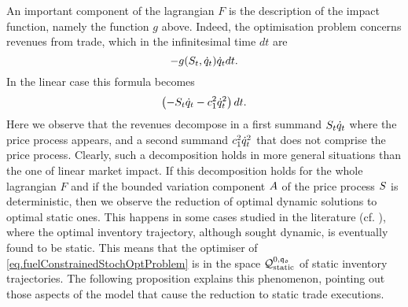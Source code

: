 \documentclass[10pt,a4paper]{article}
\begin{document}
An important component of the lagrangian $F$ is the description of the impact function, namely the function $g$ above. Indeed, the optimisation problem concerns revenues from trade, which in the infinitesimal time $dt$ are 
\begin{equation*}
-g(S_t, \dot{q}_t) \dot{q}_t dt.
\end{equation*}
In the linear case this formula becomes
\begin{equation*}
\left(-S_t \dot{q}_t - c_{1}^{2} \dot{q}_t^{2} \right) dt.
\end{equation*}
Here we observe that the revenues decompose in a first summand $S_t \dot{q}_t$ where the price process appears, and a second summand $c_{1}^{2} \dot{q}_t^{2}$ that does not comprise the price process. Clearly, such a decomposition holds in more general situations than the one of linear market impact. If this decomposition holds for the whole lagrangian $F$ and if the bounded variation component $A$ of the price process $S$ is deterministic, then we observe the reduction of optimal dynamic solutions to optimal static ones.   This happens in some cases studied in the literature (cf. \cite[Sections 6.3 and 6.4]{CJP15alg}), where the optimal inventory trajectory, although sought dynamic, is eventually found to be static. This means that the optimiser of \eqref{eq.fuelConstrainedStochOptProblem} is in the space $\mathcal{Q}_{\text{static}}^{0,\mathfrak{q_0}}$ of static inventory trajectories. The following proposition explains this phenomenon, pointing out those aspects of the model that cause the reduction to static trade executions. 
\end{document}
